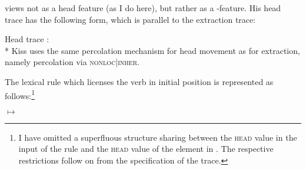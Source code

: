 \begin{exe}
\begin{xlist}
\citet{Kiss95a} views \dsl not as a head feature (as I do here), but rather as a
\nonloc-feature. His head trace has the following form, which is parallel to the extraction trace:

\ea
Head trace \citep[]{Kiss95a}:\\*
\z
Kiss uses the same percolation mechanism for head movement as for extraction, namely percolation
via \textsc{nonloc|inher}.

The lexical rule which licenses the verb in initial position is represented as follows:\footnote{
		I have omitted a superfluous structure sharing between the \textsc{head} value in the input
		of the rule and the \textsc{head} value of the element in \subcat. The respective
		restrictions follow on from the specification of the trace.%
}

\eas
\label{kiss-dsl-lr}
 $\mapsto$ \\
\zs


\end{xlist}
\end{exe}
